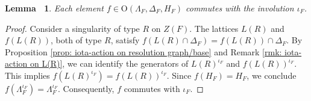 \documentclass[12pt,reqno,a4paper]{amsart}
\newtheorem{lem}[thm]{Lemma~}
\theoremstyle{remark}
\theoremstyle{definition}
\begin{document}
\begin{lem}\label{lem: Aut(Lambda_F,H_F,Delta_F) commutes with iota_F}
Each element $f\in \mathrm{O}(\Lambda_{F}, \Delta_{F},H_{F})$ commutes with the involution $\iota_{F}$.
\end{lem}
\begin{proof}
Consider a singularity of type $R$ on $Z(F)$. The lattices $L(R)$ and $f(L(R))$, both of type $R$, satisfy $f(L(R)\cap \Delta_{F}) = f(L(R))\cap \Delta_{F}$. 
By Proposition \ref{prop: iota-action on resolution graph/base} and Remark \ref{rmk: iota-action on L(R)}, we can identify the generators of $L(R)^{\iota_{F}}$ and $f(L(R))^{\iota_{F}}$. 
This implies $f(L(R)^{\iota_{F}}) = f(L(R))^{\iota_{F}}$. 
Since $f(H_{F})=H_{F}$, we conclude $f(\Lambda_{F}^{\iota_{F}})=\Lambda_{F}^{\iota_{F}}$. 
Consequently, $f$ commutes with $\iota_{F}$.
\end{proof}
\end{document}
